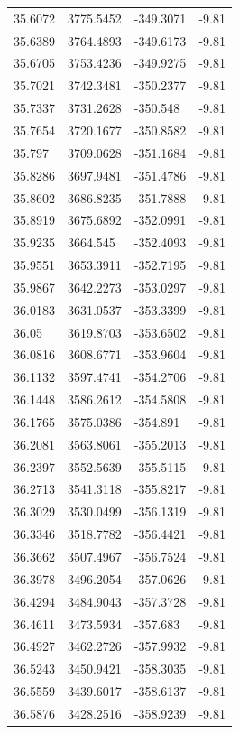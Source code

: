 \begin{table}[H]
\begin{tabular}{llll}
35.6072 & 3775.5452 & -349.3071 & -9.81 \\
35.6389 & 3764.4893 & -349.6173 & -9.81 \\
35.6705 & 3753.4236 & -349.9275 & -9.81 \\
35.7021 & 3742.3481 & -350.2377 & -9.81 \\
35.7337 & 3731.2628 & -350.548 & -9.81 \\
35.7654 & 3720.1677 & -350.8582 & -9.81 \\
35.797 & 3709.0628 & -351.1684 & -9.81 \\
35.8286 & 3697.9481 & -351.4786 & -9.81 \\
35.8602 & 3686.8235 & -351.7888 & -9.81 \\
35.8919 & 3675.6892 & -352.0991 & -9.81 \\
35.9235 & 3664.545 & -352.4093 & -9.81 \\
35.9551 & 3653.3911 & -352.7195 & -9.81 \\
35.9867 & 3642.2273 & -353.0297 & -9.81 \\
36.0183 & 3631.0537 & -353.3399 & -9.81 \\
36.05 & 3619.8703 & -353.6502 & -9.81 \\
36.0816 & 3608.6771 & -353.9604 & -9.81 \\
36.1132 & 3597.4741 & -354.2706 & -9.81 \\
36.1448 & 3586.2612 & -354.5808 & -9.81 \\
36.1765 & 3575.0386 & -354.891 & -9.81 \\
36.2081 & 3563.8061 & -355.2013 & -9.81 \\
36.2397 & 3552.5639 & -355.5115 & -9.81 \\
36.2713 & 3541.3118 & -355.8217 & -9.81 \\
36.3029 & 3530.0499 & -356.1319 & -9.81 \\
36.3346 & 3518.7782 & -356.4421 & -9.81 \\
36.3662 & 3507.4967 & -356.7524 & -9.81 \\
36.3978 & 3496.2054 & -357.0626 & -9.81 \\
36.4294 & 3484.9043 & -357.3728 & -9.81 \\
36.4611 & 3473.5934 & -357.683 & -9.81 \\
36.4927 & 3462.2726 & -357.9932 & -9.81 \\
36.5243 & 3450.9421 & -358.3035 & -9.81 \\
36.5559 & 3439.6017 & -358.6137 & -9.81 \\
36.5876 & 3428.2516 & -358.9239 & -9.81 \\

\end{tabular}
\end{table}

